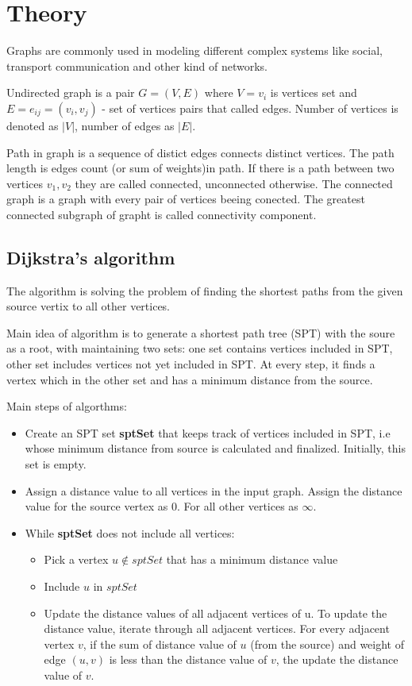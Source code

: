 \section*{Theory}

Graphs are commonly used in modeling different complex systems like social, transport communication and other kind of networks.

Undirected graph is a pair $G = (V, E)$ where $V = {v_i}$ is vertices set and $E = {e_{ij}} = {(v_i, v_j)}$ - set of vertices pairs that called edges.
Number of vertices is denoted as $|V|$, number of edges as $|E|$.

Path in graph is a sequence of distict edges connects distinct vertices. The path length is edges count (or sum of weights)in path.
If there is a path between two vertices $v_1, v_2$ they are called connected, unconnected otherwise. The connected graph is a graph with every pair of vertices beeing conected.
The greatest connected subgraph of grapht is called connectivity component.

\subsection*{Dijkstra's algorithm}

The algorithm is solving the problem of finding the shortest paths from the given source vertix to all other vertices.

Main idea of algorithm is to generate a shortest path tree (SPT) with the soure as a root, with maintaining two sets: one set contains vertices included in SPT, other set includes vertices not yet included in SPT. At every step, it finds a vertex which in the other set and has a minimum distance from the source.

Main steps of algorthms: 
\begin{itemize}
    \item Create an SPT set \textbf{sptSet} that keeps track of vertices included in SPT, i.e whose minimum distance from source is calculated and finalized. Initially, this set is empty.
    \item Assign a distance value to all vertices in the input graph. Assign the distance value for the source vertex as 0. For all other vertices as $\infty$.
    \item While \textbf{sptSet} does not include all vertices:
     \begin{itemize}
         \item Pick a vertex $u \notin sptSet$ that has a minimum distance value
         \item Include $u$ in $sptSet$
         \item Update the distance values of all adjacent vertices of u. To update the distance value, iterate through all adjacent vertices. For every adjacent vertex $v$, if the sum of distance value of $u$ (from the source) and weight of edge $(u, v)$ is less than the distance value of $v$, the update the distance value of $v$.
     \end{itemize}
\end{itemize}

